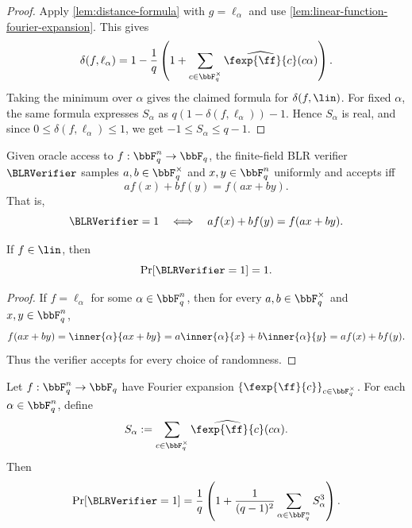 \begin{proof}
Apply \cref{lem:distance-formula} with $g=\ell_\alpha$ and use
\cref{lem:linear-function-fourier-expansion}. This gives
\[
    \delta(f,\ell_\alpha)
    =1-\frac{1}{q}\left(1+
        \sum_{c\in\bbF_q^\times}
        \widehat{\fexp{\ff}{c}}(c\alpha)
    \right).
\]
Taking the minimum over $\alpha$ gives the claimed formula for
$\delta(f,\lin)$.
For fixed $\alpha$, the same formula expresses $S_\alpha$ as
$q(1-\delta(f,\ell_\alpha))-1$. Hence $S_\alpha$ is real, and since
$0\le \delta(f,\ell_\alpha)\le 1$, we get $-1\le S_\alpha\le q-1$.
\end{proof}

\begin{definition}
\label{def:finite-field-blr-test}
Given oracle access to $f:\bbF_q^n\to\bbF_q$, the finite-field BLR verifier
$\BLRVerifier$ samples $a,b\in\bbF_q^\times$ and $x,y\in\bbF_q^n$ uniformly and accepts iff
\[
    a f(x)+b f(y)=f(ax+by).
\]
That is,
\[
    \BLRVerifier=1
    \quad\Longleftrightarrow\quad
    a f(x)+b f(y)=f(ax+by).
\]
\end{definition}

\begin{lemma}[Completeness]
\label{lem:blr-completeness}
If $f\in\lin$, then
\[
    \Pr[\BLRVerifier=1]=1.
\]
\end{lemma}

\begin{proof}
If $f=\ell_\alpha$ for some $\alpha\in\bbF_q^n$, then for every
$a,b\in\bbF_q^\times$ and $x,y\in\bbF_q^n$,
\[
    f(ax+by)
    =\inner{\alpha}{ax+by}
    =a\inner{\alpha}{x}+b\inner{\alpha}{y}
    =a f(x)+b f(y).
\]
Thus the verifier accepts for every choice of randomness.
\end{proof}

\begin{lemma}
\label{lem:exact-blr-acceptance}
Let $f:\bbF_q^n\to\bbF_q$ have Fourier expansion
$\{\fexp{\ff}{c}\}_{c\in\bbF_q^\times}$.
For each $\alpha\in\bbF_q^n$, define
\[
    S_\alpha := \sum_{c\in\bbF_q^\times}
        \widehat{\fexp{\ff}{c}}(c\alpha).
\]
Then
\[
    \Pr[\BLRVerifier=1]
    = \frac{1}{q}\left(1+\frac{1}{(q-1)^2}
        \sum_{\alpha\in\bbF_q^n} S_\alpha^3
    \right).
\]
\end{lemma}

